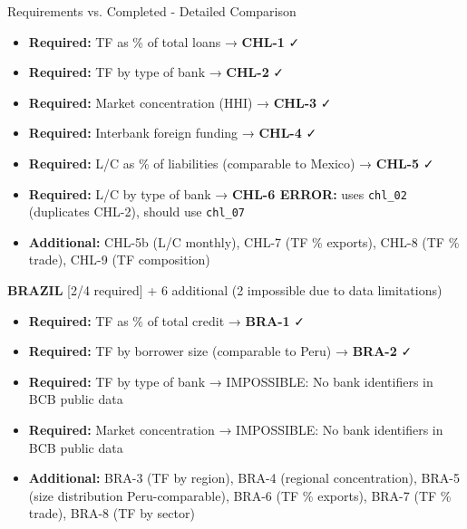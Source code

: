 \documentclass[aspectratio=169,11pt]{beamer}
\begin{document}
\begin{frame}{Requirements vs. Completed - Detailed Comparison}
\begin{itemize}
    \item[\textcolor{green!60!black}{✓}] \textbf{Required:} TF as \% of total loans → \textbf{CHL-1} ✓
    \item[\textcolor{green!60!black}{✓}] \textbf{Required:} TF by type of bank → \textbf{CHL-2} ✓
    \item[\textcolor{green!60!black}{✓}] \textbf{Required:} Market concentration (HHI) → \textbf{CHL-3} ✓
    \item[\textcolor{green!60!black}{✓}] \textbf{Required:} Interbank foreign funding → \textbf{CHL-4} ✓
    \item[\textcolor{green!60!black}{✓}] \textbf{Required:} L/C as \% of liabilities (comparable to Mexico) → \textbf{CHL-5} ✓
    \item[\textcolor{orange!80!black}{⚠}] \textbf{Required:} L/C by type of bank → \textbf{CHL-6 ERROR:} uses \texttt{chl\_02} (duplicates CHL-2), should use \texttt{chl\_07}
    \item \textbf{Additional:} CHL-5b (L/C monthly), CHL-7 (TF \% exports), CHL-8 (TF \% trade), CHL-9 (TF composition)
\end{itemize}

\vspace{0.15cm}

\textbf{BRAZIL} \textcolor{orange!80!black}{[2/4 required]} + 6 additional (\textcolor{red!80!black}{2 impossible due to data limitations})

\begin{itemize}
    \item[\textcolor{green!60!black}{✓}] \textbf{Required:} TF as \% of total credit → \textbf{BRA-1} ✓
    \item[\textcolor{green!60!black}{✓}] \textbf{Required:} TF by borrower size (comparable to Peru) → \textbf{BRA-2} ✓
    \item[\textcolor{red!80!black}{✗}] \textbf{Required:} TF by type of bank → \textcolor{red!80!black}{IMPOSSIBLE:} No bank identifiers in BCB public data
    \item[\textcolor{red!80!black}{✗}] \textbf{Required:} Market concentration → \textcolor{red!80!black}{IMPOSSIBLE:} No bank identifiers in BCB public data
    \item \textbf{Additional:} BRA-3 (TF by region), BRA-4 (regional concentration), BRA-5 (size distribution Peru-comparable), BRA-6 (TF \% exports), BRA-7 (TF \% trade), BRA-8 (TF by sector)
\end{itemize}

\end{frame}
\end{document}
